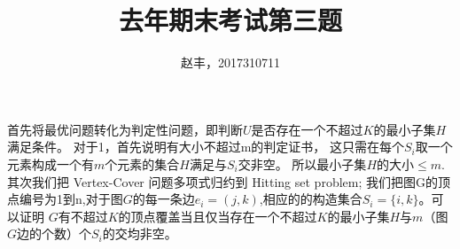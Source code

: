 ﻿\documentclass{article}
\begin{document}
\title{去年期末考试第三题}
\author{赵丰，2017310711}
\maketitle
首先将最优问题转化为判定性问题，即判断$U$是否存在一个不超过$K$的最小子集$H$满足条件。
对于1，首先说明有大小不超过m的判定证书，
这只需在每个$S_i$取一个元素构成一个有$m$个元素的集合$H$满足与$S_i$交非空。
所以最小子集$H$的大小$\leq m$. 
其次我们把 Vertex-Cover 问题多项式归约到 Hitting set problem;
我们把图G的顶点编号为1到n,对于图$G$的每一条边$e_i=(j,k)$,相应的的构造集合$S_i=\{i,k\}$。可以证明
$G$有不超过$K$的顶点覆盖当且仅当存在一个不超过$K$的最小子集$H$与$m$（图$G$边的个数）个$S_i$的交均非空。
\end{document}
